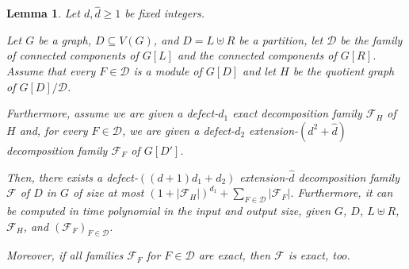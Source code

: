 \documentclass[11pt,a4paper]{article}
\newtheorem{lemma}[theorem]{Lemma}
\theoremstyle{definition}
\begin{document}
\begin{lemma}\label{lem:handle-bip}
    Let $d,\widehat{d} \geq 1$ be fixed integers.
    
    Let $G$ be a graph, $D \subseteq V(G)$, and $D = L \uplus R$ be a partition, 
    let $\mathcal{D}$ be the family of connected components of $G[L]$
    and the connected components of $G[R]$. 
    Assume that every $F \in \mathcal{D}$ is a module of $G[D]$
    and let $H$ be the quotient graph of $G[D]/\mathcal{D}$. 

    Furthermore, assume we are given a defect-$d_1$ exact decomposition family $\mathcal{F}_H$ of $H$ 
    and, for every $F \in \mathcal{D}$, we are given a defect-$d_2$ extension-$(d^2+\widehat{d})$ decomposition
    family $\mathcal{F}_{F}$ of $G[D']$. 

    Then, there exists a defect-$((d+1)d_1+d_2)$ extension-$\widehat{d}$
    decomposition family $\mathcal{F}$ of $D$ in $G$ of size
    at most $(1+|\mathcal{F}_H|)^{d_1} + \sum_{F \in \mathcal{D}} |\mathcal{F}_{F}|$. 
    Furthermore, it can be computed in time polynomial in the input and output size,
    given $G$, $D$, $L \uplus R$, $\mathcal{F}_H$, and $(\mathcal{F}_{F})_{F \in \mathcal{D}}$. 

    Moreover, if all families $\mathcal{F}_{F}$ for $F \in \mathcal{D}$ are exact,
    then $\mathcal{F}$ is exact, too.
\end{lemma}
\end{document}
